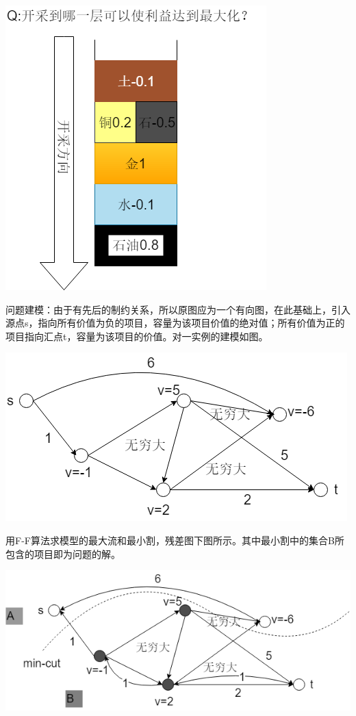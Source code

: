 \centerline{\includegraphics[scale=0.6]{Ln11.image/networkflow8.png}}

问题建模：由于有先后的制约关系，所以原图应为一个有向图，在此基础上，引入源点s，指向所有价值为负的项目，容量为该项目价值的绝对值；所有价值为正的项目指向汇点t，容量为该项目的价值。对一实例的建模如图。

\centerline{\includegraphics[scale=0.6]{Ln11.image/networkflow9.png}}


用F-F算法求模型的最大流和最小割，残差图下图所示。其中最小割中的集合B所包含的项目即为问题的解。

\centerline{\includegraphics[scale=0.6]{Ln11.image/networkflow10.png}}

